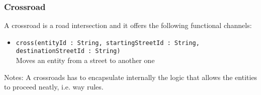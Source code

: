 \subsubsection{Crossroad}
A crossroad is a road intersection and it offers the following functional channels:
\begin{itemize}
	\item \texttt{cross(entityId : String, startingStreetId : String, destinationStreetId : String)}
	\\Moves an entity from a street to another one
\end{itemize}
Notes:
A crossroads has to encapsulate internally the logic that allows the entities to proceed neatly, i.e. way rules.
